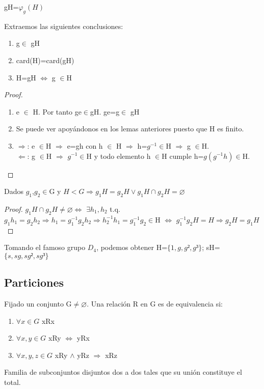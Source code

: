 \documentclass[a4paper,10pt]{apuntes}
\newenvironment{notacion}[1][Notación:]{\begin{trivlist}
\item[\hskip \labelsep {\bfseries #1}]}{\end{trivlist}}
\begin{document}
  \begin{notacion}
   gH=$\varphi_{g}(H)$
  \end{notacion}

  \begin{corol} 
  Extraemos las siguientes conclusiones:
   \begin{enumerate}
    \item g$\in$  gH
    \item card(H)=card(gH)
    \item H=gH $\Leftrightarrow$  g $\in$H
   \end{enumerate}
  \end{corol}

  \begin{proof}
   \begin{enumerate}
    \item e $\in$  H. Por tanto g\ast e$\in$gH. g\ast e=g$\in$ gH
    \item Se puede ver apoyándonos en los lemas anteriores puesto que H es finito.
    \item $\Rightarrow$:  e $\in$H $\Rightarrow$ e=gh con h $\in$ H $\Rightarrow$ h=$g^{-1}\in$H $\Rightarrow$ g $\in$H.\\
	  $\Leftarrow$:  g $\in$H $\Rightarrow$ $g^{-1}\in$H y todo elemento h $\in$H cumple h=$g(g^{-1}h)\in$H.
   \end{enumerate}
  \end{proof}
  
  \begin{prop}
   Dados $g_{1}$,$g_{2}\in$G y $H<G\Rightarrow g_{1}H=g_{2}H \vee g_{1}H\cap g_{2}H=\varnothing$
  \end{prop}
  \begin{proof}
   $g_{1}H\cap g_{2}H \neq \varnothing \Leftrightarrow$ $\exists h_{1},h_{2}$  t.q. $g_{1}h_{1}=g_{2}h_{2} \Rightarrow h_{1}=g_{1}^{-1}g_{2}h_{2} \Rightarrow h_{2}^{-1}h_{1}=g_{1}^{-1}g_{2}\in$H
   $\Leftrightarrow$ $g_{1}^{-1}g_{2}H=H \Rightarrow g_{2}H=g_{1}H$
  \end{proof}
  \begin{example}
   Tomando el famoso grupo $D_{4}$, podemos obtener H=$\{1,g,g²,g³\}$; sH=$\{s,sg,sg²,sg³\}$
  \end{example}
  \subsection{Particiones}
  \begin{defn}
   Fijado un conjunto G$\neq\varnothing$. Una relación R en G es de equivalencia si:
   \begin{enumerate}
    \item $\forall x\in G$  xRx
    \item $\forall x,y \in G$  xRy $\Leftrightarrow$  yRx
    \item $\forall x,y,z \in G$  xRy $\wedge$  yRz $\Rightarrow$  xRz
   \end{enumerate}
  \end{defn}
  \begin{defn}[Partición]
   Familia de subconjuntos disjuntos dos a dos tales que su unión constituye el total.
  \end{defn}
  
\end{document}
